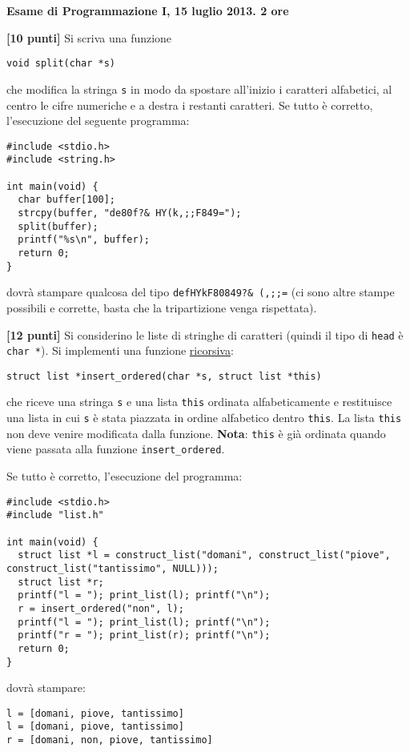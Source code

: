 \documentclass{article}[10pt]
\newcounter{esnu}
\newenvironment{esercizio}{\medskip \noindent {\bf Esercizio\addtocounter{esnu}{1} \arabic{esnu}}}{}
\begin{document}
\begin{center} {\bf Esame di Programmazione I, 15 luglio 2013. 2 ore}\end{center}

\begin{esercizio}
\textbf{[10 punti]}
Si scriva una funzione

\begin{verbatim}
void split(char *s)
\end{verbatim}

\noindent
che modifica la stringa \texttt{s} in modo da spostare all'inizio i caratteri alfabetici,
al centro le cifre numeriche e a destra i restanti caratteri.
Se tutto \`e corretto, l'esecuzione del seguente programma:

{\small
\begin{verbatim}
#include <stdio.h>
#include <string.h>

int main(void) {
  char buffer[100];
  strcpy(buffer, "de80f?& HY(k,;;F849=");
  split(buffer);
  printf("%s\n", buffer);
  return 0;
}
\end{verbatim}
}

\noindent
dovr\`a stampare qualcosa del tipo \texttt{defHYkF80849?\& (,;;=}\quad
(ci sono altre stampe possibili e corrette, basta che la tripartizione venga rispettata).
\end{esercizio}

\begin{esercizio}
\textbf{[12 punti]}
Si considerino le liste di stringhe di caratteri (quindi il tipo di \texttt{head}
\`e \texttt{char *}). Si implementi una funzione \underline{ricorsiva}:
\begin{verbatim}
struct list *insert_ordered(char *s, struct list *this)
\end{verbatim}
che riceve una stringa \texttt{s} e una lista \texttt{this} ordinata alfabeticamente e restituisce una lista
in cui \texttt{s} \`e stata piazzata in ordine alfabetico dentro \texttt{this}. La lista \texttt{this} non deve
venire modificata dalla funzione. \textbf{Nota}: \texttt{this}
\`e
gi\`a ordinata quando viene passata alla funzione \texttt{insert\_ordered}.

Se tutto \`e corretto, l'esecuzione del programma:

{\small
\begin{verbatim}
#include <stdio.h>
#include "list.h"

int main(void) {
  struct list *l = construct_list("domani", construct_list("piove", construct_list("tantissimo", NULL)));
  struct list *r;
  printf("l = "); print_list(l); printf("\n");
  r = insert_ordered("non", l);
  printf("l = "); print_list(l); printf("\n");
  printf("r = "); print_list(r); printf("\n");
  return 0;
}

\end{verbatim}
}
\noindent
dovr\`a stampare:

{\small
\begin{verbatim}
l = [domani, piove, tantissimo]
l = [domani, piove, tantissimo]
r = [domani, non, piove, tantissimo]
\end{verbatim}
}
%
\end{esercizio}
\end{document}
